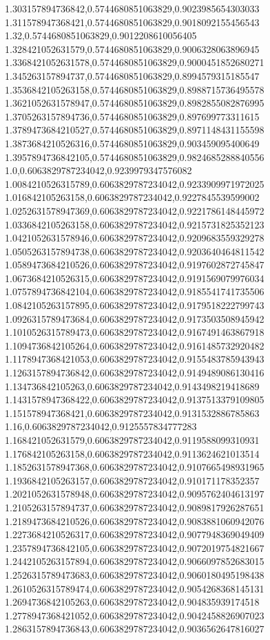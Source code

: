 1.303157894736842,0.5744680851063829,0.9023985654303033
1.311578947368421,0.5744680851063829,0.9018092155456543
1.32,0.5744680851063829,0.9012208610056405
1.328421052631579,0.5744680851063829,0.9006328063896945
1.3368421052631578,0.5744680851063829,0.9000451852680271
1.345263157894737,0.5744680851063829,0.8994579315185547
1.3536842105263158,0.5744680851063829,0.8988715736495578
1.3621052631578947,0.5744680851063829,0.8982855082876995
1.3705263157894736,0.5744680851063829,0.897699773311615
1.3789473684210527,0.5744680851063829,0.8971148431155598
1.3873684210526316,0.5744680851063829,0.903459095400649
1.3957894736842105,0.5744680851063829,0.9824685288840556
1.0,0.6063829787234042,0.9239979347576082
1.0084210526315789,0.6063829787234042,0.9233909971972025
1.016842105263158,0.6063829787234042,0.9227845539599002
1.0252631578947369,0.6063829787234042,0.9221786148445972
1.0336842105263158,0.6063829787234042,0.9215731825352123
1.0421052631578946,0.6063829787234042,0.9209683559329278
1.0505263157894738,0.6063829787234042,0.9203640464811542
1.0589473684210526,0.6063829787234042,0.9197602872745847
1.0673684210526315,0.6063829787234042,0.9191569079976034
1.0757894736842104,0.6063829787234042,0.9185541741735506
1.0842105263157895,0.6063829787234042,0.9179518222799743
1.0926315789473684,0.6063829787234042,0.9173503508945942
1.1010526315789473,0.6063829787234042,0.9167491463867918
1.1094736842105264,0.6063829787234042,0.9161485732920482
1.1178947368421053,0.6063829787234042,0.9155483785943943
1.1263157894736842,0.6063829787234042,0.9149489086130416
1.134736842105263,0.6063829787234042,0.9143498219418689
1.1431578947368422,0.6063829787234042,0.9137513379109805
1.151578947368421,0.6063829787234042,0.9131532886785863
1.16,0.6063829787234042,0.9125557834777283
1.168421052631579,0.6063829787234042,0.9119588099310931
1.176842105263158,0.6063829787234042,0.9113624621013514
1.1852631578947368,0.6063829787234042,0.9107665498931965
1.1936842105263157,0.6063829787234042,0.910171178352357
1.2021052631578948,0.6063829787234042,0.9095762404613197
1.2105263157894737,0.6063829787234042,0.9089817926287651
1.2189473684210526,0.6063829787234042,0.9083881060942076
1.2273684210526317,0.6063829787234042,0.9077948369049409
1.2357894736842105,0.6063829787234042,0.9072019754821667
1.2442105263157894,0.6063829787234042,0.9066097852683015
1.2526315789473683,0.6063829787234042,0.9060180495198438
1.2610526315789474,0.6063829787234042,0.9054268368145131
1.2694736842105263,0.6063829787234042,0.904835939174518
1.2778947368421052,0.6063829787234042,0.9042458826907023
1.2863157894736843,0.6063829787234042,0.9036562647816027
